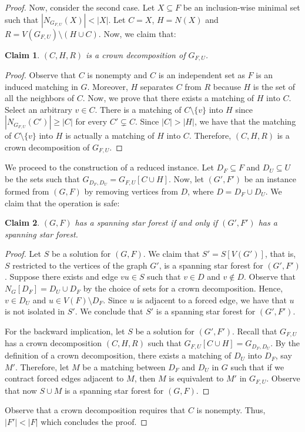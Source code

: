 \documentclass[en]{pracamgr}
\newtheorem{claim}{Claim}
\theoremstyle{definition}
\begin{document}
\begin{proof}
	Now, consider the second case. Let $X \subseteq F$ be an inclusion-wise minimal set such that $|N_{G_{F,U}}(X)| < |X|$. Let $C=X$, $H=N(X)$ and $R= V(G_{F,U}) \setminus (H \cup C)$. Now, we claim that:
	\begin{claim}
		$(C,H,R)$ is a crown decomposition of $G_{F,U}$.
	\end{claim}
	\begin{proof}
		Observe that $C$ is nonempty and $C$ is an independent set as $F$ is an induced matching in $G$. Moreover, $H$ separates $C$ from $R$ because $H$ is the set of all the neighbors of $C$. Now, we prove that there exists a matching of $H$ into $C$. Select an arbitrary $v \in C$. There is a matching of $C \setminus \{v\}$ into $H$ since $|N_{G_{F,U}}(C')| \geq |C|$ for every $C' \subsetneq C$. Since $|C| > |H|$, we have that the matching of $C \setminus \{v\}$ into $H$ is actually a matching of $H$ into $C$. Therefore, $(C,H,R)$ is a crown decomposition of $G_{F,U}$.
	\end{proof}

	We proceed to the construction of a reduced instance. Let $D_F \subseteq F$ and $D_U \subseteq U$ be the sets such that $G_{D_F,D_U} = G_{F,U}[C \cup H]$. Now, let $(G',F')$ be an instance formed from $(G,F)$ by removing vertices from $D$, where $D = D_F \cup D_U$. We claim that the operation is safe:
	
	\begin{claim}
		$(G,F)$ has a spanning star forest if and only if $(G',F')$ has a spanning star forest.
	\end{claim}
	\begin{proof}		
		Let $S$ be a solution for $(G,F)$. We claim that $S' = S[V(G')]$, that is, $S$ restricted to the vertices of the graph $G'$, is a spanning star forest for $(G',F')$. Suppose there exists and edge $vu \in S$ such that $v \in D$ and $v \notin D$. Observe that $N_G[D_F] = D_U \cup D_F$ by the choice of sets for a crown decomposition. Hence, $v \in D_U$ and $u \in V(F) \setminus D_F$. Since $u$ is adjacent to a forced edge, we have that $u$ is not isolated in $S'$. We conclude that $S'$ is a spanning star forest for $(G',F')$.
		
		For the backward implication, let $S$ be a solution for $(G',F')$. Recall that $G_{F,U}$ has a crown decomposition $(C,H,R)$ such that $G_{F,U}[C \cup H] = G_{D_F,D_U}$. By the definition of a crown decomposition, there exists a matching of $D_U$ into $D_F$, say $M'$. Therefore, let $M$ be a matching between $D_F$ and $D_U$ in $G$ such that if we contract forced edges adjacent to $M$, then $M$ is equivalent to $M'$ in $G_{F,U}$. Observe that now $S \cup M$ is a spanning star forest for $(G,F)$.
	\end{proof}
	
	Observe that a crown decomposition requires that $C$ is nonempty. Thus, $|F'| < |F|$ which concludes the proof. \qedhere
	
\end{proof}
\end{document}
